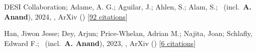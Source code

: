 \item[{\color{numcolor}\scriptsize2}] DESI Collaboration; Adame, A. G.; Aguilar, J.; Ahlen, S.; Alam, S.; \etal\ (incl.\ \textbf{A. Anand}), 2024, , ArXiv () [\href{https://ui.adsabs.harvard.edu/abs/2024arXiv241112021D}{92 citations}]

\item[{\color{numcolor}\scriptsize1}] Han, Jiwon Jesse; Dey, Arjun; Price-Whelan, Adrian M.; Najita, Joan; Schlafly, Edward F.; \etal\ (incl.\ \textbf{A. Anand}), 2023, , ArXiv () [\href{https://ui.adsabs.harvard.edu/abs/2023arXiv230611784H}{6 citations}]